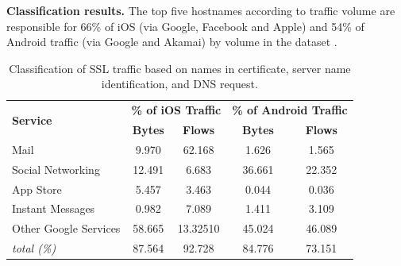 
\noindent\textbf{Classification results.} The top five hostnames according to traffic volume are responsible for 66\% of iOS (via Google, Facebook and Apple) and 54\% of Android traffic (via Google and Akamai) by volume in the \mobWild dataset . 

\begin{table}
\centering
\begin{small}
\begin{tabular}{|p{}|c|c|c|c|}
\hline
\multirow{2}{*}{\bf Service} & \multicolumn{2}{c|}{\bf \% of iOS Traffic} &  \multicolumn{2}{c|}{\bf \% of Android Traffic} \tabularnewline
\cline{2-5}
  & {\bf Bytes}  & {\bf Flows} & {\bf Bytes} & {\bf Flows} \tabularnewline
\hline
Mail                 & 9.970    & 62.168   & 1.626  & 1.565 \tabularnewline
\hline
Social Networking    & 12.491   & 6.683    & 36.661 & 22.352 \tabularnewline
\hline
App Store   & 5.457    & 3.463    & 0.044  & 0.036 \tabularnewline
\hline
Instant Messages     & 0.982    & 7.089    & 1.411  & 3.109 \tabularnewline
\hline
Other Google Services & 58.665   & 13.32510 & 45.024 & 46.089 \tabularnewline
\hline
\emph{total (\%)}         & 87.564   & 92.728   & 84.776 & 73.151 \tabularnewline
\hline
\end{tabular} 
\end{small}
\caption{Classification of \mobWild SSL traffic based on names in certificate, server name identification, and DNS request.}
\vspace{\postfigspace}
\label{tab:classify-ssl-traffic}
\end{table}

